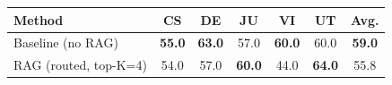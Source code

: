 \begin{tabular}{lccccc|c}
\toprule
Method & CS & DE & JU & VI & UT & \textbf{Avg.} \\
\midrule
Baseline (no RAG) & \textbf{55.0} & \textbf{63.0} & 57.0 & \textbf{60.0} & 60.0 & \textbf{59.0} \\
RAG (routed, top-K=4) & 54.0 & 57.0 & \textbf{60.0} & 44.0 & \textbf{64.0} & 55.8 \\
\bottomrule
\end{tabular}